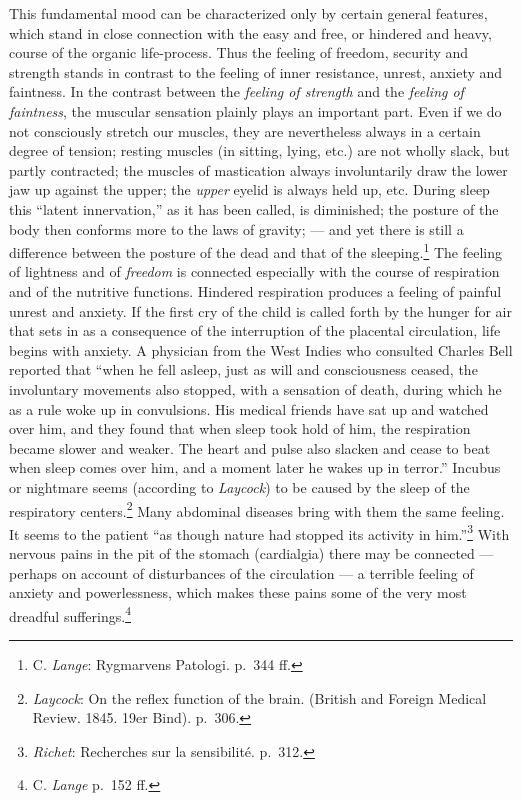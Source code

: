 \documentclass[12pt,a4paper]{book}
\newcommand{\opage}[1]{\marginnote{\footnotesize\textit{[#1]}}}
\begin{document}
This fundamental mood can be characterized only by certain general
features, which stand in close connection with the easy and free, or
hindered and heavy, course of the organic life-process. Thus the feeling
of freedom, security and strength stands in contrast to the feeling of
inner resistance, unrest, anxiety and faintness. In the contrast between
the \emph{feeling of strength} and the \emph{feeling of faintness}, the
muscular sensation plainly plays an important part. Even if we do not
consciously stretch our muscles, they are nevertheless always in a
certain degree of tension; resting muscles (in sitting, lying, etc.) are
not wholly slack, but partly contracted; the muscles of mastication
always involuntarily draw
\opage{274}the lower jaw up against the upper; the \emph{upper} eyelid is
always held up, etc. During sleep this ``latent innervation,'' as it has
been called, is diminished; the posture of the body then conforms more
to the laws of gravity; --- and yet there is still a difference between
the posture of the dead and
that of the sleeping.\footnote{C. \emph{Lange}: Rygmarvens Patologi.
p.~344 ff.} The feeling of lightness and of \emph{freedom} is connected
especially with the course of respiration and of the nutritive
functions. Hindered respiration produces a feeling of painful unrest and
anxiety. If the first cry of the child is called forth by the hunger for
air that sets in as a consequence of the interruption of the placental
circulation, life begins with anxiety. A physician from the West Indies
who consulted Charles Bell reported that ``when he fell asleep, just as
will and consciousness ceased, the involuntary movements also stopped,
with a sensation of death, during which he as a rule woke up in
convulsions. His medical friends have sat up and watched over him, and
they found that when sleep took hold of him, the respiration became
slower and weaker. The heart and pulse also slacken and cease to beat
when sleep comes over him, and a moment later he wakes up in terror.''
Incubus or nightmare seems (according to \emph{Laycock}) to be caused by
the
sleep of the respiratory centers.\footnote{\emph{Laycock}: On the reflex
function of the brain. (British and Foreign Medical Review. 1845. 19er
Bind). p.~306.} Many abdominal diseases bring with them the same
feeling. It seems to the patient ``as though nature had stopped its
activity in him.''\footnote{\emph{Richet}: Recherches sur la
sensibilité. p.~312.} With nervous pains in the pit of the stomach
(cardialgia) there may be connected --- perhaps on account of
disturbances of the circulation --- a terrible feeling of anxiety and
powerlessness, which makes these pains some of the very
most dreadful sufferings.\footnote{C. \emph{Lange} p.~152 ff.}
\end{document}
